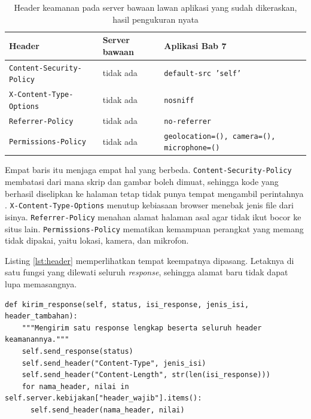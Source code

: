 \begin{table}[!htb]
  \centering
  \caption{Header keamanan pada server bawaan lawan aplikasi yang sudah
           dikeraskan, hasil pengukuran nyata}
  \label{tab:header}
  \begin{tabularx}{\textwidth}{Xll}
    \hline
    \textbf{Header} & \textbf{Server bawaan} & \textbf{Aplikasi Bab 7} \\
    \hline
    \texttt{Content-Security-}\newline\texttt{Policy} & tidak ada & \texttt{default-src 'self'} \\
    \hline
    \texttt{X-Content-Type-}\newline\texttt{Options} & tidak ada & \texttt{nosniff} \\
    \hline
    \texttt{Referrer-Policy} & tidak ada & \texttt{no-referrer} \\
    \hline
    \texttt{Permissions-Policy} & tidak ada & \texttt{geolocation=(), camera=(), microphone=()} \\
    \hline
  \end{tabularx}
\end{table}

Empat baris itu menjaga empat hal yang berbeda. \texttt{Content-Security-Policy}
membatasi dari mana skrip dan gambar boleh dimuat, sehingga kode yang
berhasil diselipkan ke halaman tetap tidak punya tempat mengambil
perintahnya \cite{w3c-csp3}. \texttt{X-Content-Type-Options} menutup
kebiasaan browser menebak jenis file dari isinya. \texttt{Referrer-Policy}
menahan alamat halaman asal agar tidak ikut bocor ke situs lain.
\texttt{Permissions-Policy} mematikan kemampuan perangkat yang memang tidak
dipakai, yaitu lokasi, kamera, dan mikrofon.

Listing \ref{lst:header} memperlihatkan tempat keempatnya dipasang. Letaknya
di satu fungsi yang dilewati seluruh \textit{response}, sehingga alamat baru
tidak dapat lupa memasangnya.

\begin{lstlisting}[style=PythonStyle, caption={Header keamanan dipasang di satu tempat, tersedia di \berkas{sources/chapter07/aplikasi.py}}, label={lst:header}]
  def kirim_response(self, status, isi_response, jenis_isi, header_tambahan):
    """Mengirim satu response lengkap beserta seluruh header keamanannya."""
    self.send_response(status)
    self.send_header("Content-Type", jenis_isi)
    self.send_header("Content-Length", str(len(isi_response)))
    for nama_header, nilai in self.server.kebijakan["header_wajib"].items():
      self.send_header(nama_header, nilai)
\end{lstlisting}

